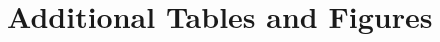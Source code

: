 \documentclass{article}
\begin{document}
\clearpage

\section*{}
\vspace{5mm}

\appendix

\renewcommand\thetable{\thesection.\arabic{table}}    
\renewcommand\thefigure{\thesection.\arabic{figure}} 
\setcounter{table}{0}
\setcounter{figure}{0}



\clearpage
\section{Additional Tables and Figures}



\clearpage


\clearpage

\clearpage

\clearpage

\end{document}
